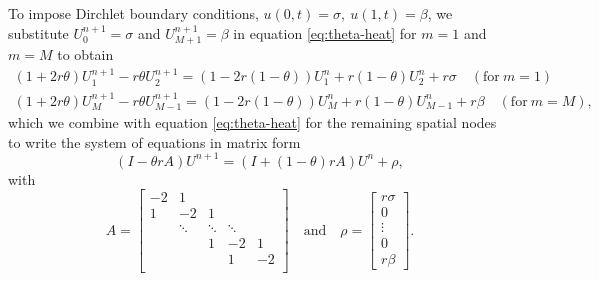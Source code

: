To impose Dirchlet boundary conditions, $u(0, t) = \sigma, \: u(1, t) = \beta$, 
we substitute $U_0^{n+1} = \sigma$ and $U_{M+1}^{n+1} = \beta$ in equation \eqref{eq:theta-heat} for $m=1$ and $m=M$ to obtain 
\begin{equation*}
\begin{split}
    (1+2r\theta)U_1^{n+1} - r\theta U_2^{n+1} = \left(1-2r(1-\theta)\right)U_1^n + r(1-\theta)U_2^n + r\sigma
    \quad (\text{for} \: m=1) \\
    (1+2r\theta)U_{M}^{n+1} - r\theta U_{M-1}^{n+1} = \left(1-2r(1-\theta)\right)U_{M}^n + r(1-\theta)U_{M-1}^n + r\beta
    \quad (\text{for} \: m=M), 
\end{split}
\end{equation*}
which we combine with equation \ref{eq:theta-heat} for the remaining spatial nodes to write the system of equations in matrix form
\begin{equation}
    (I - \theta r A)U^{n+1} = (I + (1-\theta)r A)U^n+\rho, 
    \label{eq:theta-heat-matrix}
\end{equation}
with 
\begin{equation}
    A = 
    \begin{bmatrix}
    -2 & 1 \\
    1 & -2 & 1 & \\
      & \ddots & \ddots & \ddots & \\
      &   & 1 & -2 & 1 \\
      &   &  & 1 & -2 \\
    \end{bmatrix}
    \quad \text{and} \quad
    \rho = 
    \begin{bmatrix}
        r\sigma \\ 0 \\ \vdots \\ 0 \\ r\beta
    \end{bmatrix}
    .
    \label{eq:theta-heat-matrix-dirchlet}
\end{equation}

